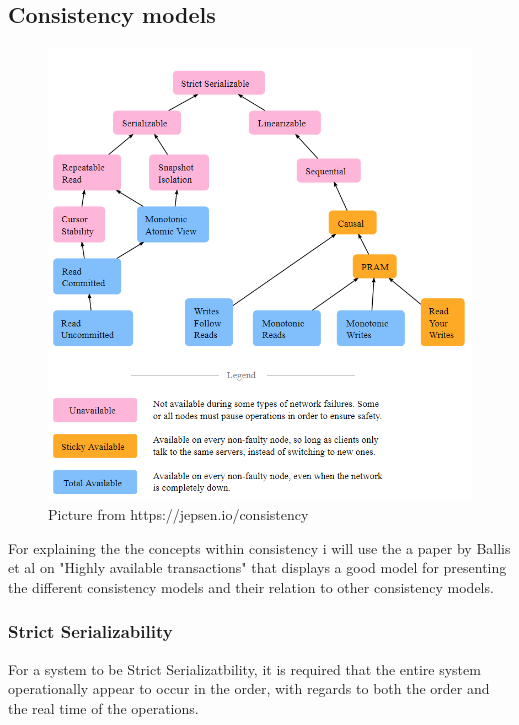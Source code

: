 \documentclass[a4paper,10pt,titlepage]{report}
\begin{document}
\subsection{Consistency models}


\begin{figure}
    \centering
       \includegraphics[scale=0.4]{images/consistency models.PNG}
     \caption{Picture from https://jepsen.io/consistency}
     \label{fig:jepsenioconsistency}
\end{figure}


For explaining the the concepts within consistency i will use the a paper by Ballis et al on "Highly available transactions"\cite{10.14778/2732232.2732237} that displays a good model for presenting the different consistency models and their relation to other consistency models.\\


\subsubsection{Strict Serializability}

For a system to be Strict Serializatbility, it is required that the entire system operationally appear to occur in the order, with regards to both the order and the real time of the operations.
\end{document}

